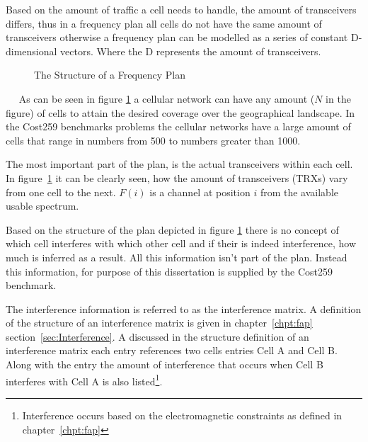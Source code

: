 Based on the amount of traffic a cell needs to handle, the amount of transceivers differs, thus in a frequency plan all cells do not have the same amount of transceivers otherwise a frequency plan can be modelled as a series of constant D-dimensional vectors. Where the D represents the amount of transceivers. 
~
\begin{figure}[ht]
	\centering
	\setlength \fboxsep{0pt}
	\setlength \fboxrule{0.5pt}
	\caption{The Structure of a Frequency Plan}
	\label{fig:fapPlan}
\end{figure}
~
~As can be seen in figure \ref{fig:fapPlan} a cellular network can have any amount ($N$ in the figure) of cells to attain the desired coverage over the geographical landscape. In the Cost259 benchmarks problems the cellular networks have a large amount of cells that range in numbers from 500 to numbers greater than 1000. 

The most important part of the plan, is the actual transceivers within each cell. In figure~\ref{fig:fapPlan} it can be clearly seen, how the amount of transceivers (TRXs) vary from one cell to the next. $F(i)$ is a channel at position $i$ from the available usable spectrum. 

Based on the structure of the plan depicted in figure \ref{fig:fapPlan} there is no concept of which cell interferes with which other cell and if their is indeed interference, how much is inferred as a result. All this information isn't part of the plan. Instead this information, for purpose of this dissertation is supplied by the Cost259 benchmark. 

The interference information is referred to as the interference matrix. A definition of the structure of an interference matrix is given in chapter~\ref{chpt:fap} section~\ref{sec:Interference}. A discussed in the structure definition of an interference matrix each entry references two cells entries Cell A and Cell B. Along with the entry the amount of interference that occurs when Cell B interferes with Cell A is also listed\footnote{Interference occurs based on the electromagnetic constraints as defined in chapter~\ref{chpt:fap}}.

